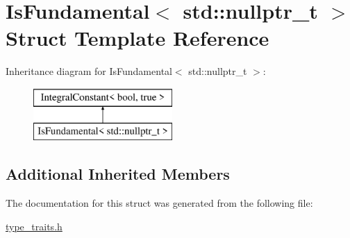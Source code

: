 \hypertarget{struct_is_fundamental_3_01std_1_1nullptr__t_01_4}{}\section{Is\+Fundamental$<$ std\+:\+:nullptr\+\_\+t $>$ Struct Template Reference}
\label{struct_is_fundamental_3_01std_1_1nullptr__t_01_4}
Inheritance diagram for Is\+Fundamental$<$ std\+:\+:nullptr\+\_\+t $>$\+:\begin{figure}[H]
\begin{center}
\leavevmode
\includegraphics[height=2.000000cm]{struct_is_fundamental_3_01std_1_1nullptr__t_01_4}
\end{center}
\end{figure}
\subsection*{Additional Inherited Members}


The documentation for this struct was generated from the following file\+:\begin{DoxyCompactItemize}
\item 
\hyperlink{type__traits_8h}{type\+\_\+traits.\+h}\end{DoxyCompactItemize}
